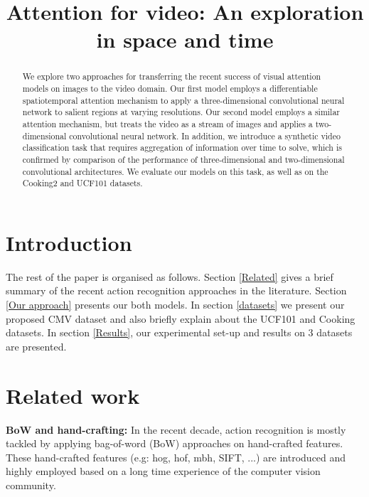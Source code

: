 \documentclass{article} %
\title{Attention for video: An exploration in space and time}
\begin{document}
\maketitle

\begin{abstract}
We explore two approaches for transferring the recent success of visual attention models on images to the video domain. Our first model employs a differentiable spatiotemporal attention mechanism to apply a three-dimensional convolutional neural network to salient regions at varying resolutions. Our second model employs a similar attention mechanism, but treats the video as a stream of images and applies a two-dimensional convolutional neural network. In addition, we introduce a synthetic video classification task that requires aggregation of information over time to solve, which is confirmed by comparison of the performance of three-dimensional and two-dimensional convolutional architectures. We evaluate our models on this task, as well as on the Cooking2 and UCF101 datasets.
\end{abstract}

\section{Introduction}
The rest of the paper is organised as follows.
Section \ref{Related} gives a brief summary of the recent action recognition approaches in the literature. 
Section \ref{Our approach} presents our both models. In section \ref{datasets} we present our proposed CMV dataset and also briefly explain about the UCF101 and Cooking datasets. In section \ref{Results}, our experimental set-up and results on 3 datasets are presented.
\section{Related work}
\textbf{BoW and hand-crafting:} In the recent decade, action recognition is mostly tackled by applying bag-of-word (BoW) approaches on hand-crafted features. These hand-crafted features (e.g: hog, hof, mbh, SIFT, ...) are introduced and highly employed based on a long time experience of the computer vision community. 
\end{document}
